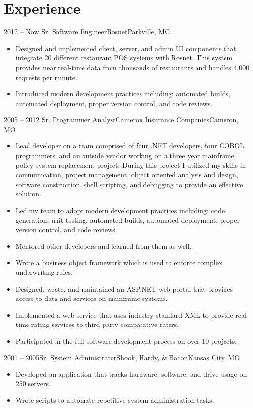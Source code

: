 \documentclass[11pt,letterpaper,final]{moderncv}
\begin{document}
\section{Experience} 
	\cventry
{2012 -- Now} {Sr. Software Engineer}{Rosnet}{Parkville, MO}{}{
		\begin{itemize}
			\item
Designed and implemented client, server, and admin UI components that integrate 20 different restaurant POS systems with Rosnet. This system provides near real-time data from thousands of restaurants and handles 4,000 requests per minute.
			\item
Introduced modern development practices including: automated builds, automated deployment,
proper version control, and code reviews.
    \end{itemize}
}
	\cventry
{2005 -- 2012} {Sr. Programmer Analyst}{Cameron Insurance Companies}{Cameron, MO}{}{
		\begin{itemize}
			\item 
Lead developer on a team comprised of four .NET developers, four COBOL programmers, and an outside
vendor working on a three year mainframe policy system replacement project. During this project I
utilized my skills in communication, project management, object oriented analysis and design, software
construction, shell scripting, and debugging to provide an effective solution.
			\item 
Led my team to adopt modern development practices including: code generation, unit testing,
automated builds, automated deployment, proper version control, and code reviews.
			\item 
Mentored other developers and learned from them as well.
			\item 
Wrote a business object framework which is used to enforce complex underwriting rules.
			\item 
Designed, wrote, and maintained an ASP.NET web portal that provides access to data and services on
mainframe systems.
			\item 
Implemented a web service that uses industry standard XML to provide real time rating services to third
party comparative raters.
			\item 
Participated in the full software development process on over 10 projects.
		\end{itemize}
}

	\cventry
{2001 -- 2005}{Sr. System Administrator}{Shook, Hardy, \& Bacon}{Kansas City, MO}{}{
	\begin{itemize}
		\item Developed an application that tracks hardware, software, and drive usage on 250 servers.
		\item Wrote scripts to automate repetitive system administration tasks.
	\end{itemize}
	}
\end{document}
